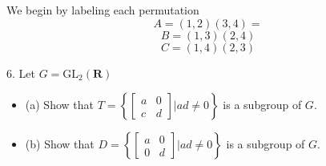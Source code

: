 \begin{mdframed}[style=darkAnswer,frametitle={Joe Starr}]
  We begin by labeling each permutation
    $$A=(1,2)(3,4)=$$$$B=(1,3)(2,4)$$$$C=(1,4)(2,3)$$
    \begin{itemize}[align=left]
  \end{itemize}
\end{mdframed}
\newpage
\begin{mdframed}[style=darkQuesion]
  6. Let $G=\mathrm{GL}_{2}(\mathbf{R})$
  \begin{itemize}
  \item [] {(a) Show that $T=\left\{\left[\begin{array}{ll}a & 0 \\ c & d\end{array}\right] | a d \neq 0\right\}$ is a subgroup of $G .$
  }
\item [] {(b) Show that $D=\left\{\left[\begin{array}{ll}a & 0 \\ 0 & d\end{array}\right] | a d \neq 0\right\}$ is a subgroup of $G .$
  } 
  \end{itemize}
    
\end{mdframed}

